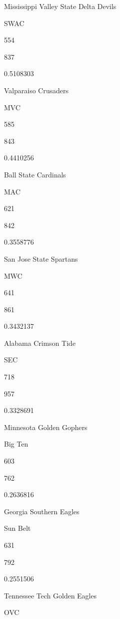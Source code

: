 \documentclass[
]{book}
\begin{document}
Mississippi Valley State Delta Devils

SWAC

554

837

0.5108303


Valparaiso Crusaders

MVC

585

843

0.4410256


Ball State Cardinals

MAC

621

842

0.3558776


San Jose State Spartans

MWC

641

861

0.3432137


Alabama Crimson Tide

SEC

718

957

0.3328691


Minnesota Golden Gophers

Big Ten

603

762

0.2636816


Georgia Southern Eagles

Sun Belt

631

792

0.2551506


Tennessee Tech Golden Eagles

OVC
\end{document}
